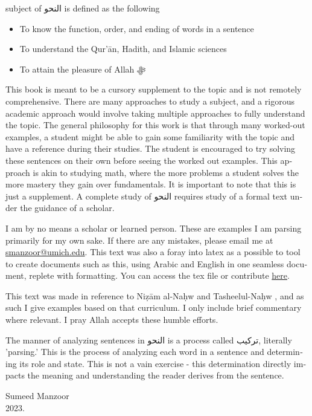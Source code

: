 \documentclass[../main.tex]{subfiles}
\begin{document}
\begin{english}
     subject of \textarabic{النحو} is defined as the following
    \begin{itemize}
        \item To know the function, order, and ending of words in a sentence
        \item To understand the Qur'ān, Hadith, and Islamic sciences
        \item To attain the pleasure of Allah ﷻ
    \end{itemize}
    This book is meant to be a cursory supplement to the topic and is not remotely comprehensive. There are many approaches to study a subject, and a rigorous academic approach would involve taking multiple approaches to fully understand the topic. The general philosophy for this work is that through many worked-out examples, a student might be able to gain some familiarity with the topic and have a reference during their studies. The student is encouraged to try solving these sentences on their own before seeing the worked out examples. This approach is akin to studying math, where the more problems a student solves the more mastery they gain over fundamentals. It is important to note that this is just a supplement. A complete study of \textarabic{النحو} requires study of a formal text under the guidance of a scholar.

    I am by no means a scholar or learned person. These are examples I am parsing primarily for my own sake. If there are any mistakes, please email me at \href{mailto:smanzoor@umich.edu}{smanzoor@umich.edu}. This text was also a foray into latex as a possible to tool to create documents such as this, using Arabic and English in one seamless document, replete with formatting. You can access the tex file or contribute \href{https://github.com/Yoyomanzoor/alnahw-bilmiran}{here}.

    This text was made in reference to Niẓām al-Naḥw \autocite{nizam} and Tasheelul-Naḥw \autocite{tasheel}, and as such I give examples based on that curriculum. I only include brief commentary where relevant. I pray Allah accepts these humble efforts.
    
    The manner of analyzing sentences in \textarabic{النحو} is a process called \textarabic{تركيب}, literally 'parsing.' This is the process of analyzing each word in a sentence and determining its role and state. This is not a vain exercise - this determination directly impacts the meaning and understanding the reader derives from the sentence.
    
    Sumeed Manzoor\\
    2023.
\end{english}

\pagebreak
\end{document}
